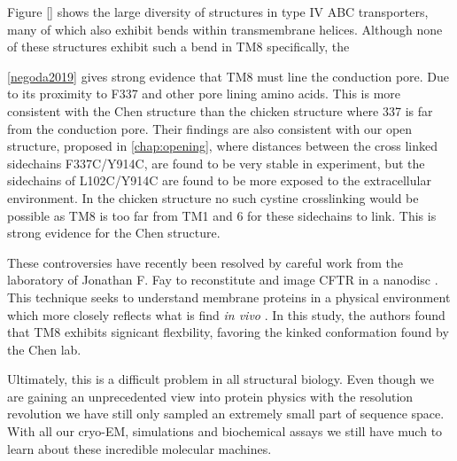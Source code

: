 
Figure \ref{} shows the large diversity of structures in type IV ABC transporters, many of which also exhibit bends within transmembrane helices\cite{thomas2020}. Although none of these structures exhibit such a bend in TM8 specifically, the 

\ref{negoda2019} gives strong evidence that TM8 must line the conduction pore. Due to its proximity to F337 and other pore lining amino acids. This is more consistent with the Chen structure than the chicken structure where 337 is far from the conduction pore. Their findings are also consistent with our open structure, proposed in \ref{chap:opening}, where distances between the cross linked sidechains F337C/Y914C, are found to be very stable in experiment, but the sidechains of L102C/Y914C are found to be more exposed to the extracellular environment. In the chicken structure no such cystine crosslinking would be possible as TM8 is too far from TM1 and 6 for these sidechains to link. This is strong evidence for the Chen structure.

These controversies have recently been resolved by careful work from the laboratory of Jonathan F. Fay to reconstitute and image CFTR in a nanodisc \cite{aleksandrov2022}. This technique seeks to understand membrane proteins in a physical environment which more closely reflects what is find \textit{in vivo} \cite{}. In this study, the authors found that TM8 exhibits signicant flexbility, favoring the kinked conformation found by the Chen lab.

Ultimately, this is a difficult problem in all structural biology. Even though we are gaining an unprecedented view into protein physics with the resolution revolution we have still only sampled an extremely small part of sequence space. With all our cryo-EM, simulations and biochemical assays we still have much to learn about these incredible molecular machines.



